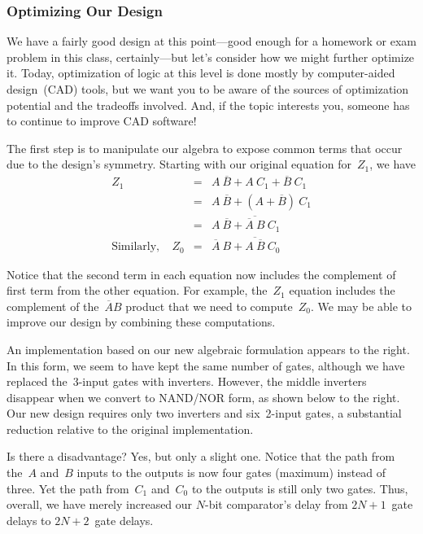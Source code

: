 \centerline{}\vspace{12pt}


\subsubsection{Optimizing Our Design}

We have a fairly good design at this point---good enough for a homework
or exam problem in this class, certainly---but let's consider how we
might further optimize it.  Today, optimization of logic at this level is 
done mostly by computer-aided design~(CAD) tools, but we want you to 
be aware of the sources of optimization potential and the tradeoffs 
involved.  And, if the topic interests you, someone has to continue to 
improve CAD software!

The first step is to manipulate our algebra to expose common terms that
occur due to the design's symmetry.  Starting with our original equation
for~$Z_1$, we have
%
\begin{eqnarray*}
Z_1 &=& A~\overline{B} + A~C_1 + \overline{B}~C_1\\
    &=& A~\overline{B} + \left( A + \overline{B} \right) ~C_1\\
    &=& A~\overline{B} + \overline{\overline{A}~B}~C_1\\
\mbox{Similarly,}~~~~~Z_0 &=& \overline{A}~B + \overline{A~\overline{B}}~C_0
\end{eqnarray*}\vspace{-12pt}

Notice that the second term in each equation now includes the complement of 
first term from the other equation.  For example, the~$Z_1$ equation includes
the complement of the~$\overline{A}B$ product that we need to compute~$Z_0$.  
We may be able to improve our design by combining these computations.

\begin{minipage}{2.15in}
An implementation based on our new algebraic formulation appears to the 
right.  In this form, we seem to have kept the same number of gates,
although we have replaced the~\mbox{3-input} gates with inverters.
However, the middle inverters disappear when we convert to NAND/NOR form,
as shown below to the right.  Our new design requires only two inverters
and six~\mbox{2-input} gates, a substantial reduction relative to the
original implementation.\mpline

Is there a disadvantage?  Yes, but only a slight one.  Notice that the
path from the~$A$ and~$B$ inputs to the outputs is now four gates (maximum)
instead of three.  Yet the path from~$C_1$ and~$C_0$ to the outputs is
still only two gates.  Thus, overall, we have merely increased our
\mbox{$N$-bit} comparator's delay from $2N+1$~gate delays to
$2N+2$~gate delays.
\end{minipage}\hspace{.25in}%
\begin{minipage}{4.1in}
\vspace{36pt}

\end{minipage}\mpdone

